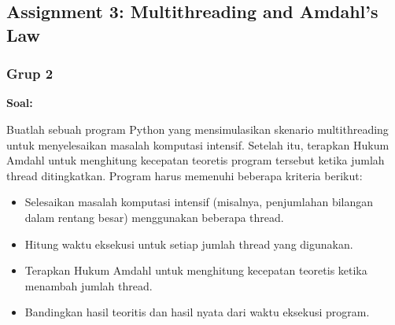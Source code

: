 \documentclass[12pt]{article}
\begin{document}
\subsection{Assignment 3: Multithreading and Amdahl's Law}
\subsubsection{Grup 2}
    \textbf{Soal:}
    \par Buatlah sebuah program Python yang mensimulasikan skenario multithreading untuk menyelesaikan masalah komputasi intensif. Setelah itu, terapkan Hukum Amdahl untuk menghitung kecepatan teoretis program tersebut ketika jumlah thread ditingkatkan. Program harus memenuhi beberapa kriteria berikut:
    \begin{itemize}
    \item Selesaikan masalah komputasi intensif (misalnya, penjumlahan bilangan dalam rentang besar) menggunakan beberapa thread.
    \item Hitung waktu eksekusi untuk setiap jumlah thread yang digunakan.
    \item Terapkan Hukum Amdahl untuk menghitung kecepatan teoretis ketika menambah jumlah thread.
    \item Bandingkan hasil teoritis dan hasil nyata dari waktu eksekusi program.
    \end{itemize}
    
\end{document}
